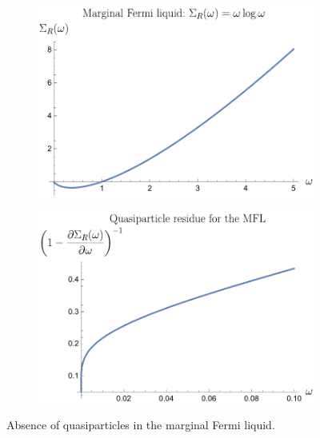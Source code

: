 \begin{figure}
    \centering
    \begin{subfigure}[b]{0.4\textwidth}
    \centering
    \includegraphics[width = \textwidth]{figures/introduction/MFLS.pdf}
    \end{subfigure}
    \begin{subfigure}[b]{0.4\textwidth}
    \centering
    \includegraphics[width = \textwidth]{figures/introduction/MFLZ.pdf}
    \end{subfigure}
    \caption{Absence of quasiparticles in the marginal Fermi liquid.}
    \label{fig:MFLZ}
\end{figure}

